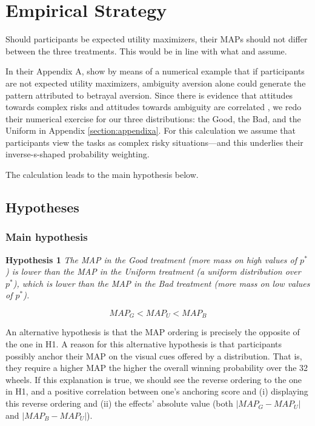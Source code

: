 \section{Empirical Strategy}
Should participants be expected utility maximizers, their MAPs should not differ between the three treatments.
This would be in line with what \cite{Bohnet2004} and \cite{Bohnet2008} assume.

In their Appendix A, \cite{Li2020a} show by means of a numerical example that if participants are not expected utility maximizers, ambiguity aversion alone could generate the pattern attributed to betrayal aversion.
Since there is evidence that attitudes towards complex risks and attitudes towards ambiguity are correlated \citep{Armantier2016}, we redo their numerical exercise for our three distributions: the Good, the Bad, and the Uniform in Appendix \ref{section:appendixa}.
For this calculation we assume that participants view the tasks as complex risky situations---and this underlies their inverse-s-shaped probability weighting.

The calculation leads to the main hypothesis below.



\subsection{Hypotheses}
\subsubsection{Main hypothesis}
\noindent \textbf{Hypothesis 1} \quad \textit{The MAP in the Good treatment (more mass on high values of $p^*$) is lower than the MAP in the Uniform treatment (a uniform distribution over $p^*$), which is lower than the MAP in the Bad treatment (more mass on low values of $p^*$).}

\begin{equation}
MAP_G < MAP_U < MAP_B
\end{equation}

An alternative hypothesis is that the MAP ordering is precisely the opposite of the one in H1.
A reason for this alternative hypothesis is that participants possibly anchor their MAP on the visual cues offered by a distribution.
That is, they require a higher MAP the higher the overall winning probability over the 32 wheels.
If this explanation is true, we should see the reverse ordering to the one in H1, and a positive correlation between one's anchoring score and (i) displaying this reverse ordering and (ii) the effects' absolute value (both $|MAP_G - MAP_U|$ and $|MAP_B - MAP_U|$).


